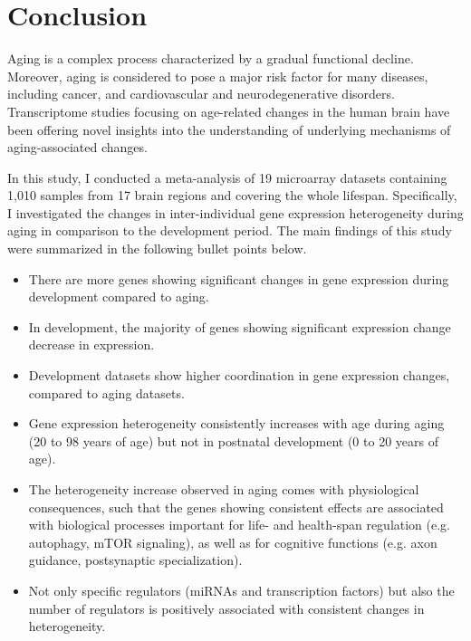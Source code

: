 \chapter{Conclusion}
\label{chp:b5}

Aging is a complex process characterized by a gradual functional decline.
Moreover, aging is considered to pose a major risk factor for many diseases, including cancer, and cardiovascular and neurodegenerative disorders.
Transcriptome studies focusing on age-related changes in the human brain have been offering novel insights into the understanding of underlying mechanisms of aging-associated changes.

In this study, I conducted a meta-analysis of 19 microarray datasets containing 1,010 samples from 17 brain regions and covering the whole lifespan.
Specifically, I investigated the changes in inter-individual gene expression heterogeneity during aging in comparison to the development period.
The main findings of this study were summarized in the following bullet points below.

\begin{itemize}
    \item There are more genes showing significant changes in gene expression during development compared to aging.
    \item In development, the majority of genes showing significant expression change decrease in expression.
    \item Development datasets show higher coordination in gene expression changes, compared to aging datasets.
    \item Gene expression heterogeneity consistently increases with age during aging (20 to 98 years of age) but not in postnatal development (0 to 20 years of age).
    \item The heterogeneity increase observed in aging comes with physiological consequences, 
    such that the genes showing consistent effects are associated with biological processes important for life- and health-span regulation 
    (e.g. autophagy, mTOR signaling), as well as for cognitive functions (e.g. axon guidance, postsynaptic specialization).
    \item Not only specific regulators (miRNAs and transcription factors) but also the number of regulators is positively associated with consistent changes in heterogeneity. 
\end{itemize}
